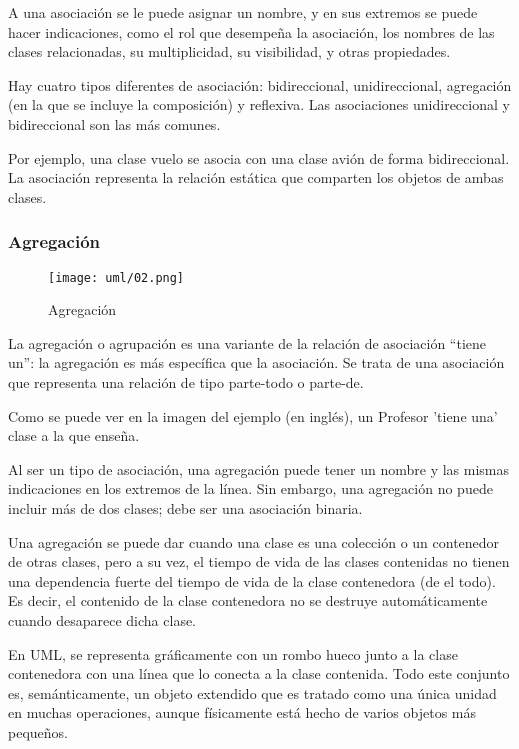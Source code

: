A una asociación se le puede asignar un nombre, y en sus extremos se puede hacer indicaciones, como el rol que desempeña la asociación, los nombres de las clases relacionadas, su multiplicidad, su visibilidad, y otras propiedades.

Hay cuatro tipos diferentes de asociación: bidireccional, unidireccional, agregación (en la que se incluye la composición) y reflexiva. Las asociaciones unidireccional y bidireccional son las más comunes.

Por ejemplo, una clase vuelo se asocia con una clase avión de forma bidireccional. La asociación representa la relación estática que comparten los objetos de ambas clases.

\subsubsection*{Agregación}


\begin{figure}[h!t] 
    \centering
    \texttt{[image: uml/02.png]}
    \caption{Agregación}
    \label{img:uml-agregacion}
\end{figure}


La agregación o agrupación es una variante de la relación de asociación “tiene un”: la agregación es más específica que la asociación. Se trata de una asociación que representa una relación de tipo parte-todo o parte-de.


Como se puede ver en la imagen del ejemplo (en inglés), un Profesor 'tiene una' clase a la que enseña.


Al ser un tipo de asociación, una agregación puede tener un nombre y las mismas indicaciones en los extremos de la línea. Sin embargo, una agregación no puede incluir más de dos clases; debe ser una asociación binaria.


Una agregación se puede dar cuando una clase es una colección o un contenedor de otras clases, pero a su vez, el tiempo de vida de las clases contenidas no tienen una dependencia fuerte del tiempo de vida de la clase contenedora (de el todo). Es decir, el contenido de la clase contenedora no se destruye automáticamente cuando desaparece dicha clase.


En UML, se representa gráficamente con un rombo hueco junto a la clase contenedora con una línea que lo conecta a la clase contenida. Todo este conjunto es, semánticamente, un objeto extendido que es tratado como una única unidad en muchas operaciones, aunque físicamente está hecho de varios objetos más pequeños.

